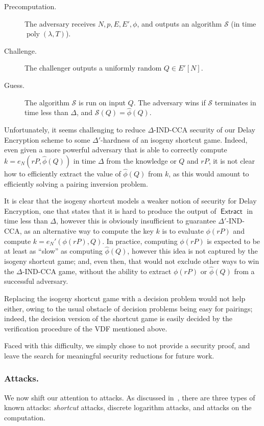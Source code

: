 \documentclass{llncs}
\DeclareMathOperator{\poly}{poly}
\DeclareMathOperator{\Extract}{\mathsf{Extract}}
\begin{document}
\begin{description}
\item[Precomputation.] The adversary receives $N,p,E,E',\phi$, and
  outputs an algorithm $\mathcal{S}$ (in time $\poly(\lambda,T)$).
\item[Challenge.] The challenger outputs a uniformly random
  $Q\in E'[N]$.
\item[Guess.] The algorithm $\mathcal{S}$ is run on input $Q$. The
  adversary wins if $\mathcal{S}$ terminates in time less than
  $\Delta$, and $\mathcal{S}(Q) = \hat\phi(Q)$.
\end{description}

Unfortunately, it seems challenging to reduce $\Delta$-IND-CCA
security of our Delay Encryption scheme to some $\Delta'$-hardness of
an isogeny shortcut game. %
Indeed, even given a more powerful adversary that is able to correctly
compute $k=e_N(rP,\hat\phi(Q))$ in time $\Delta$ from the knowledge or
$Q$ and $rP$, it is not clear how to efficiently extract the value of
$\hat\phi(Q)$ from $k$, as this would amount to efficiently solving a
pairing inversion problem.

It is clear that the isogeny shortcut models a weaker notion of
security for Delay Encryption, one that states that it is hard to
produce the output of $\Extract$ in time less than $\Delta$, however
this is obviously insufficient to guarantee $\Delta'$-IND-CCA, as an
alternative way to compute the key $k$ is to evaluate $\phi(rP)$ and
compute $k=e_N'(\phi(rP), Q)$. %
In practice, computing $\phi(rP)$ is expected to be at least as
``slow'' as computing $\hat\phi(Q)$, however this idea is not captured
by the isogeny shortcut game; and, even then, that would not exclude
other ways to win the $\Delta$-IND-CCA game, without the ability to
extract $\phi(rP)$ or $\hat\phi(Q)$ from a successful adversary.

Replacing the isogeny shortcut game with a decision problem would not
help either, owing to the usual obstacle of decision problems being
easy for pairings; indeed, the decision version of the shortcut game
is easily decided by the verification procedure of the VDF mentioned
above.

Faced with this difficulty, we simply chose to not provide a security
proof, and leave the search for meaningful security reductions for
future work.

\subsubsection{Attacks.} We now shift our attention to attacks. %
As discussed in~\cite{10.1007/978-3-030-34578-5_10}, there are three
types of known attacks: \emph{shortcut} attacks, discrete logarithm
attacks, and attacks on the computation.
\end{document}
